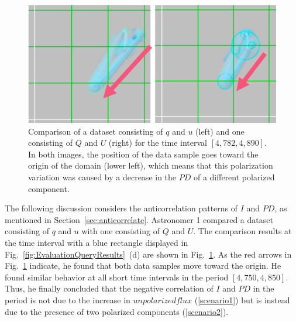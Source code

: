 \begin{figure}[tb]
    \centering
    \includegraphics[width=.8\linewidth]{vgtc_journal_latex/figures/stokesComparisonLabel.png}
    \caption{Comparison of a dataset consisting of $q$ and $u$ (left) and one consisting of $Q$ and $U$ (right) for the time interval $[4{,}782, 4{,}890]$.
    In both images, the position of the data sample goes toward the origin of the domain (lower left), which means that this polarization variation was caused by a decrease in the $PD$ of a different polarized component.}
    \label{fig:comparisonQIUIvsQU}
\end{figure}

The following discussion considers the anticorrelation patterns of $I$ and $PD$, as mentioned in Section~\ref{sec:anticorrelate}.
Astronomer 1 compared a dataset consisting of $q$ and $u$ with one consisting of $Q$ and $U$. The comparison results at the time interval with a blue rectangle displayed in Fig.~\ref{fig:EvaluationQueryResults}~(d) are shown in Fig.~\ref{fig:comparisonQIUIvsQU}.
As the red arrows in Fig.~\ref{fig:comparisonQIUIvsQU} indicate, 
he found that both data samples move toward the origin.
He found similar behavior at all short time intervals in the period $[4{,}750, 4{,}850]$.
Thus, he finally concluded that the negative correlation of $I$ and $PD$ in the period is not due to the increase in $unpolarized flux$ (\ref{scenario1}) but is instead due to the presence of two polarized components (\ref{scenario2}). 

